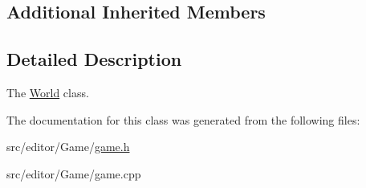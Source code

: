 \subsection*{Additional Inherited Members}


\subsection{Detailed Description}
The \hyperlink{class_world}{World} class. 

The documentation for this class was generated from the following files\+:\begin{DoxyCompactItemize}
\item 
src/editor/\+Game/\hyperlink{game_8h}{game.\+h}\item 
src/editor/\+Game/game.\+cpp\end{DoxyCompactItemize}
